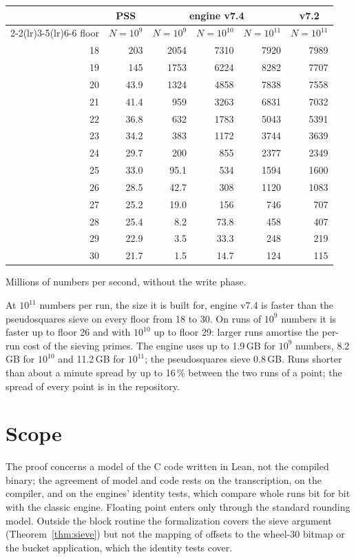 \documentclass[11pt]{amsart}
\theoremstyle{definition}
\begin{document}
\begin{center}
\begin{tabular}{rrrrrr}
\toprule
 & \multicolumn{1}{c}{PSS} & \multicolumn{3}{c}{engine v7.4} & \multicolumn{1}{c}{v7.2} \\
\cmidrule(lr){2-2}\cmidrule(lr){3-5}\cmidrule(lr){6-6}
floor & $N = 10^9$ & $N = 10^9$ & $N = 10^{10}$ & $N = 10^{11}$ & $N = 10^{11}$ \\
\midrule
18 & 203 & 2054 & 7310 & 7920 & 7989 \\
19 & 145 & 1753 & 6224 & 8282 & 7707 \\
20 & 43.9 & 1324 & 4858 & 7838 & 7558 \\
21 & 41.4 & 959 & 3263 & 6831 & 7032 \\
22 & 36.8 & 632 & 1783 & 5043 & 5391 \\
23 & 34.2 & 383 & 1172 & 3744 & 3639 \\
24 & 29.7 & 200 & 855 & 2377 & 2349 \\
25 & 33.0 & 95.1 & 534 & 1594 & 1600 \\
26 & 28.5 & 42.7 & 308 & 1120 & 1083 \\
27 & 25.2 & 19.0 & 156 & 746 & 707 \\
28 & 25.4 & 8.2 & 73.8 & 458 & 407 \\
29 & 22.9 & 3.5 & 33.3 & 248 & 219 \\
30 & 21.7 & 1.5 & 14.7 & 124 & 115 \\
\bottomrule
\end{tabular}

\smallskip
{\small Millions of numbers per second, without the write phase.}
\end{center}

At $10^{11}$ numbers per run, the size it is built for, engine v7.4 is faster than the
pseudosquares sieve on every floor from 18 to 30. On runs of $10^9$ numbers it is faster up
to floor 26 and with $10^{10}$ up to floor 29: larger runs amortise the per-run cost of the
sieving primes. The engine uses up to 1.9\,GB for $10^9$ numbers, 8.2\,GB for $10^{10}$ and
11.2\,GB for $10^{11}$; the pseudosquares sieve 0.8\,GB. Runs shorter than about a minute
spread by up to 16\,\% between the two runs of a point; the spread of every point is in the
repository.

\section{Scope}\label{sec:scope}

The proof concerns a model of the C code written in Lean, not the compiled binary; the
agreement of model and code rests on the transcription, on the compiler, and on the engines'
identity tests, which compare whole runs bit for bit with the classic engine. Floating point
enters only through the standard rounding model. Outside the block routine the formalization
covers the sieve argument (Theorem~\ref{thm:sieve}) but not the mapping of offsets to the
wheel-30 bitmap or the bucket application, which the identity tests cover.
\end{document}
